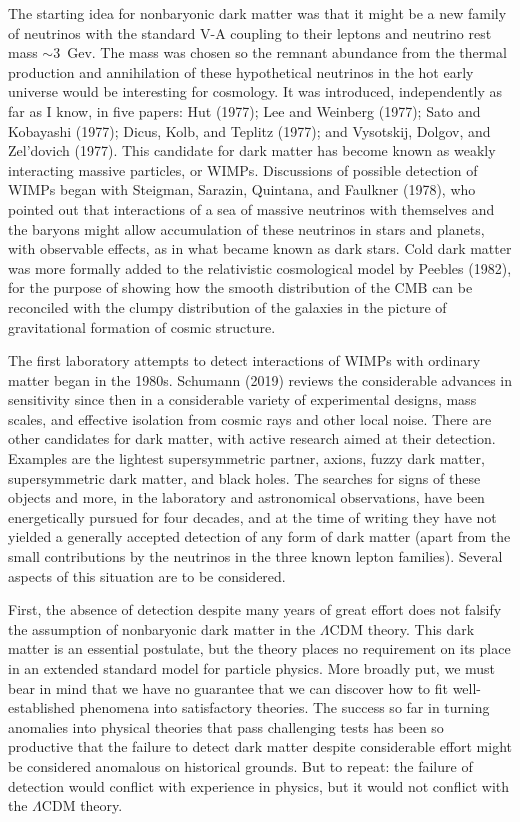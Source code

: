 \documentclass[fleqn,usenatbib]{mnras}
\begin{document}
The starting idea for nonbaryonic dark matter was that it might be a new family of neutrinos with the standard V-A coupling to their leptons and neutrino rest mass $\sim 3$~Gev. The mass was chosen so the remnant abundance from the thermal production and annihilation of these hypothetical neutrinos in the hot early universe would be interesting for cosmology. It was introduced, independently as far as I know, in five papers: Hut (1977); Lee and Weinberg (1977); Sato and Kobayashi (1977);  Dicus, Kolb, and Teplitz (1977);  and Vysotskij, Dolgov, and Zel'dovich (1977). This candidate for dark matter has become known as weakly interacting massive particles, or WIMPs. Discussions of possible detection of WIMPs began with Steigman, Sarazin, Quintana, and Faulkner (1978), who pointed out that interactions of a sea of massive neutrinos with themselves and the baryons might allow accumulation of these neutrinos in stars and planets, with observable effects, as in what became known as dark stars. Cold dark matter was more formally added to the relativistic cosmological model by Peebles (1982), for the purpose of showing how the smooth distribution of the CMB can be reconciled with the clumpy distribution of the galaxies in the picture of gravitational formation of cosmic structure. 

The first laboratory attempts to detect interactions of WIMPs with ordinary matter began in the 1980s. Schumann (2019) reviews the considerable advances in sensitivity since then in a considerable variety of experimental designs, mass scales, and effective isolation from cosmic rays and other local noise. There are other candidates for dark matter, with active research aimed at their detection. Examples are the lightest supersymmetric partner, axions, fuzzy dark matter, supersymmetric dark matter, and black holes. The searches for signs of these objects and more, in the laboratory and astronomical observations, have been energetically pursued for four decades, and at the time of writing they have not yielded a generally accepted detection of any form of dark matter (apart from the small contributions by the neutrinos in the three known lepton families). Several aspects of this situation are to be considered. 

First, the absence of detection despite many years of great effort does not falsify the assumption of nonbaryonic dark matter in the $\Lambda$CDM theory. This dark matter is an essential postulate, but the theory places no requirement on its place in an extended standard model for particle physics. More broadly put, we must bear in mind that we have no guarantee that we can discover how to fit well-established phenomena into satisfactory theories. The success so far in turning anomalies into physical theories that pass challenging tests has been so productive that the failure to detect dark matter despite considerable effort might be considered anomalous on historical grounds. But to repeat: the failure of detection would conflict with experience in physics, but it would not conflict with the $\Lambda$CDM theory. 
\end{document}
